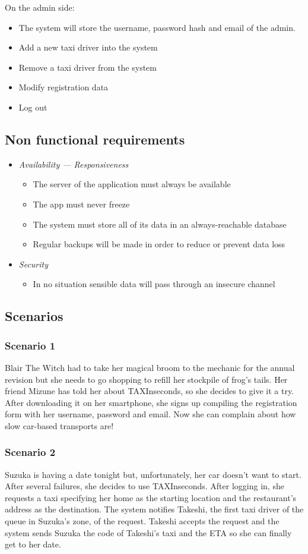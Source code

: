 \documentclass{article}
\begin{document}
On the admin side:\@
\begin{itemize}
	\item The system will store the username, password hash and email of the admin.
	\item Add a new taxi driver into the system
	\item Remove a taxi driver from the system
	\item Modify registration data
	\item Log out
\end{itemize}
\subsection{Non functional requirements}
\begin{itemize}
	\item \textit{Availability --- Responsiveness}
		\begin{itemize}
			\item The server of the application must always be available
			\item The app must never freeze 
			\item The system must store all of its data in an always-reachable database
			\item Regular backups will be made in order to reduce or prevent data loss
		\end{itemize}
	\item \textit{Security}
		\begin{itemize}
			\item In no situation sensible data will pass through an insecure channel
		\end{itemize}
\end{itemize}
\subsection{Scenarios}
\subsubsection{Scenario 1}
Blair The Witch had to take her magical broom to the mechanic for the annual revision but she needs to go shopping to refill her stockpile of frog's tails. Her friend Mizune has told her about TAXInseconds, so she decides to give it a try. After downloading it on her smartphone, she signs up compiling the registration form with her username, password and email. Now she can complain about how slow car-based transports are!
\subsubsection{Scenario 2}
Suzuka is having a date tonight but, unfortunately, her car doesn't want to start. After several failures, she decides to use TAXInseconds\@. After logging in, she requests a taxi specifying her home as the starting location and the restaurant's address as the destination. The system notifies Takeshi, the first taxi driver of the queue in Suzuka's zone, of the request. Takeshi accepts the request and the system sends Suzuka the code of Takeshi's taxi and the ETA so she can finally get to her date.
\end{document}
